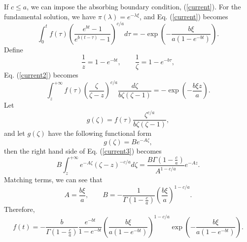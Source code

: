 \documentclass[12pt]{article}
\begin{document}
    If $c\le a$, we can impose the absorbing boundary condition, (\ref{current}).
    For the fundamental solution, we have $\pi(\lambda)=e^{-\lambda\xi}$, and Eq. (\ref{current}) becomes
    \begin{equation}
      \int_0^tf(\tau)\left(\frac{e^{bt}-1}{e^{b(t-\tau)}-1}\right)^{c/a}d\tau = -\exp\left(-\frac{b\xi}{a(1-e^{-bt})}\right).
      \label{current2}
    \end{equation}
    Define
    \begin{equation}
      \frac{1}{z}=1-e^{-bt}, \quad\quad \frac{1}{\zeta}=1-e^{-b\tau},
    \end{equation}
    Eq. (\ref{current2}) becomes
    \begin{equation}
      \int_z^{+\infty}f(\tau)\left(\frac{\zeta}{\zeta-z}\right)^{c/a}\frac{d\zeta}{b\zeta(\zeta-1)}=-\exp\left(-\frac{b\xi z}{a}\right).
      \label{current3}
    \end{equation}
    Let
    \begin{equation}
      g(\zeta) = f(\tau)\frac{\zeta^{c/a}}{b\zeta(\zeta-1)},
    \end{equation}
    and let $g(\zeta)$ have the following functional form
    \begin{equation}
      g(\zeta) = Be^{-A\zeta},
    \end{equation}
    then the right hand side of  Eq. (\ref{current3}) becomes
    \begin{equation}
      B\int_z^{+\infty}e^{-A\zeta}(\zeta-z)^{-c/a}d\zeta = \frac{\displaystyle B\Gamma\left(1-\frac{c}{a}\right)}{\displaystyle A^{1-c/a}}e^{-Az}.
    \end{equation}
    Matching terms, we can see that
    \begin{equation}
      A = \frac{b\xi}{a}, \quad\quad B = -\frac{1}{\displaystyle \Gamma\left(1-\frac{c}{a}\right)}\left(\frac{b\xi}{a}\right)^{1-c/a}.
    \end{equation}
    Therefore,
    \begin{equation}
      f(t)=-\frac{b}{\displaystyle \Gamma\left(1-\frac{c}{a}\right)}\frac{e^{-bt}}{1-e^{-bt}}\left(\frac{b\xi}{a(1-e^{-bt})}\right)^{1-c/a}
            \exp\left(-\frac{b\xi}{a(1-e^{-bt})}\right).
    \end{equation}
\end{document}
